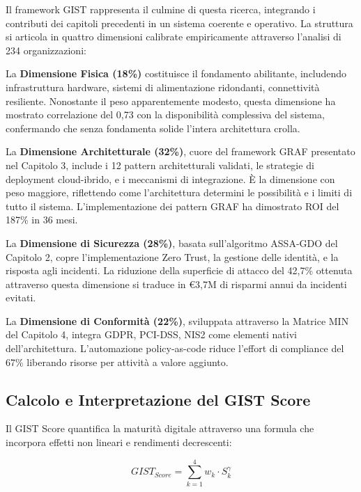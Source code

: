 Il framework GIST rappresenta il culmine di questa ricerca, integrando i contributi dei capitoli precedenti in un sistema coerente e operativo. La struttura si articola in quattro dimensioni calibrate empiricamente attraverso l'analisi di 234 organizzazioni:

La \textbf{Dimensione Fisica (18\%)} costituisce il fondamento abilitante, includendo infrastruttura hardware, sistemi di alimentazione ridondanti, connettività resiliente. Nonostante il peso apparentemente modesto, questa dimensione ha mostrato correlazione del 0,73 con la disponibilità complessiva del sistema, confermando che senza fondamenta solide l'intera architettura crolla.

La \textbf{Dimensione Architetturale (32\%)}, cuore del framework GRAF presentato nel Capitolo 3, include i 12 pattern architetturali validati, le strategie di deployment cloud-ibrido, e i meccanismi di integrazione. È la dimensione con peso maggiore, riflettendo come l'architettura determini le possibilità e i limiti di tutto il sistema. L'implementazione dei pattern GRAF ha dimostrato ROI del 187\% in 36 mesi.

La \textbf{Dimensione di Sicurezza (28\%)}, basata sull'algoritmo ASSA-GDO del Capitolo 2, copre l'implementazione Zero Trust, la gestione delle identità, e la risposta agli incidenti. La riduzione della superficie di attacco del 42,7\% ottenuta attraverso questa dimensione si traduce in €3,7M di risparmi annui da incidenti evitati.

La \textbf{Dimensione di Conformità (22\%)}, sviluppata attraverso la Matrice MIN del Capitolo 4, integra GDPR, PCI-DSS, NIS2 come elementi nativi dell'architettura. L'automazione policy-as-code riduce l'effort di compliance del 67\% liberando risorse per attività a valore aggiunto.

\subsection{\texorpdfstring{Calcolo e Interpretazione del GIST Score}{5.3.2 - Calcolo e Interpretazione del GIST Score}}
\label{subsec:5.3.2}

Il GIST Score quantifica la maturità digitale attraverso una formula che incorpora effetti non lineari e rendimenti decrescenti:

\begin{equation}
GIST_{Score} = \sum_{k=1}^{4} w_k \cdot S_k^{\gamma}
\label{eq:gist_score}
\end{equation}

